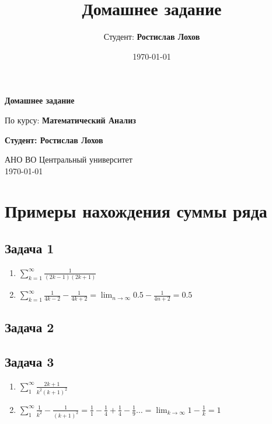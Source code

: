 \documentclass[a4paper,12pt]{article}
\title{Домашнее задание}
\author{Студент: \textbf{Ростислав Лохов}}
\date{\today}
\begin{document}
\begin{titlepage}
	\centering
	\vspace*{1cm}

	\Huge
	\textbf{Домашнее задание}

	\vspace{0.5cm}
	\LARGE
	По курсу: \textbf{Математический Анализ}

	\vspace{1.5cm}

	\textbf{Студент: Ростислав Лохов}

	\vfill

	\Large
	АНО ВО Центральный университет\\
	\vspace{0.3cm}
	\today

\end{titlepage}

\tableofcontents
\newpage

\section{Примеры нахождения суммы ряда}

\subsection{Задача 1}

\begin{enumerate}
    \item $\sum_{k=1}^{\infty} \frac{1}{(2k-1)(2k+1)}$
    \item $\sum_{k=1}^{\infty} \frac{1}{4k-2} - \frac{1}{4k+2} = \lim_{n \to \infty}0.5 - \frac{1}{4n+2} = 0.5$ 
\end{enumerate}


\subsection{Задача 2}


\subsection{Задача 3}
\begin{enumerate}
	\item $\sum_{1}^{\infty} \frac{2k+1}{k^2(k+1)^2}$
	\item $\sum_{1}^{\infty} \frac{1}{k^2}-\frac{1}{(k+1)^2} = \frac{1}{1} - \frac{1}{4} + \frac{1}{4} - \frac{1}{9} \dots = \lim_{k \to \infty} 1- \frac{1}{k} = 1$
\end{enumerate}
\end{document}
